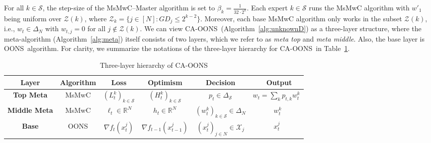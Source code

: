 \documentclass{article}
\theoremstyle{plain}
\theoremstyle{definition}
\theoremstyle{remark}
\newcommand{\cS}{\mathcal{S}}
\newcommand{\cZ}{\mathcal{Z}}
\newcommand{\oons}{{\sc OONS}}
\newcommand{\cawe}{{\sc CA-OONS}}
\newcommand{\real}{\mathbb{R}}
\newcommand{\inner}[2]{\left\langle #1, #2 \right\rangle}
\begin{document}
For all $k\in\cS$, the step-size of the MsMwC--Master algorithm is set to $\beta_k=\frac{1}{32\cdot 2^k}$. Each expert $k\in\cS$ runs the MsMwC algorithm with $w'_1$ being uniform over $\cZ(k)$, where $\cZ_k=\{j\in[N]:GD_j\leq 2^{k-2}\}$. Moreover, each base MsMwC algorithm only works in the subset $\cZ(k)$, i.e., $w_t\in \Delta_N$ with $w_{t,j}=0$ for all $j\notin \cZ(k)$. We can view \cawe\ (Algorithm~\ref{alg:unknownD}) as a three-layer structure, where the meta-algorithm (Algorithm~\ref{alg:meta}) itself consists of two layers, which we refer to as \emph{meta top} and \emph{meta middle}. Also, the base layer is \oons\ algorithm. For clarity, we summarize the notations of the three-layer hierarchy for \cawe~in Table~\ref{tab:cawe}.

{\small 
\begin{table}[t]
\centering
\caption{Three-layer hierarchy of \cawe}
\vspace{1em}
\renewcommand{\arraystretch}{1.4} 
\begin{tabularx}{\textwidth}{c|c|c|c|c|X}
\hline

\hline
\textbf{Layer} & \textbf{Algorithm} & \textbf{Loss} & \textbf{Optimism} & \textbf{Decision} & $\quad\;\;$ \textbf{Output} \\
\hline
\textbf{Top Meta} 
& MsMwC 
&  \((L_t^k)_{k \in \cS}\) 
& \((H_t^k)_{k \in \cS}\) 
& \(p_t \in \Delta_{\cS}\) 
& \(w_t\!=\!\sum_{k} p_{t,k} w_t^k\) \\
\hline
\textbf{Middle Meta} 
& MsMwC 
& \(\ell_t \in \mathbb{R}^N\) 
& \(h_t \in \mathbb{R}^N\)
& \((w_t^k)_{k\in\cS} \in \Delta_N\)
& \(\qquad\quad  w_t^k\) \\
\hline
\textbf{Base} 
& OONS 
& \(\nabla f_t(x_t^j)\) 
& \(\nabla f_{t-1}(x_{t-1}^j)\) 
& \((x_t^j)_{j\in N} \in \mathcal{X}_j\) 
& \(\qquad\quad  x_t^j\) \\
\hline

\hline
\end{tabularx}
\label{tab:cawe}
\end{table}}
\end{document}
